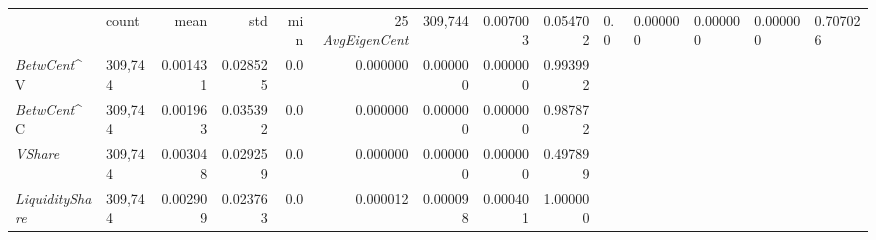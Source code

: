 \begin{tabular}{llrrrrrrr}
\toprule
{} &    count &      mean &       std &  min &       25%
\midrule
{\it AvgEigenCent}   &  309,744 &  0.007003 &  0.054702 &  0.0 &  0.000000 &  0.000000 &  0.000000 &  0.707026 \\
{\it BetwCent}^V     &  309,744 &  0.001431 &  0.028525 &  0.0 &  0.000000 &  0.000000 &  0.000000 &  0.993992 \\
{\it BetwCent}^C     &  309,744 &  0.001963 &  0.035392 &  0.0 &  0.000000 &  0.000000 &  0.000000 &  0.987872 \\
{\it VShare}         &  309,744 &  0.003048 &  0.029259 &  0.0 &  0.000000 &  0.000000 &  0.000000 &  0.497899 \\
{\it LiquidityShare} &  309,744 &  0.002909 &  0.023763 &  0.0 &  0.000012 &  0.000098 &  0.000401 &  1.000000 \\
\bottomrule
\end{tabular}
